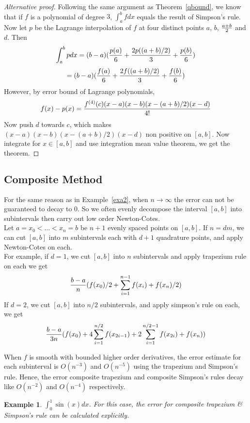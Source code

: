 \documentclass[20pt]{article} %
\theoremstyle{break}
\newtheorem{exa}[definition]{Example}
\begin{document}
\begin{proof}[Alternative proof]
  Following the same argument as Theorem~\ref{qbound}, we know that if $f$ is a polynomial of degree $3$, $\int_a^bfdx$ equals the result of Simpson's rule.\\

  Now let $p$ be the Lagrange interpolation of $f$ at four distinct points $a$, $b$, $a+b\over 2$ and $d$. Then
  \[\int_a^bpdx=(b-a)({p(a)\over 6}+{2p((a+b)/2)\over 3}+{p(b)\over 6})\]
  \[=(b-a)({f(a)\over 6}+{2f((a+b)/2)\over 3}+{f(b)\over 6})\]
  However, by error bound of Lagrange polynomials, 
  \[f(x)-p(x)={f^{(4)}(c)(x-a)(x-b)(x-(a+b)/2)(x-d)\over 4!}\]
  Now push $d$ towards $c$, which makes $(x-a)(x-b)(x-(a+b)/2)(x-d)$ non positive on $[a, b]$. Now integrate for $x\in [a, b]$ and use integration mean value theorem, we get the theorem.
\end{proof}

\newpage

\subsection{Composite Method}

For the same reason as in Example~\ref{exa2}, when $n\rightarrow\infty$ the error can not be guaranteed to decay to $0$. So we often evenly decompose the interval $[a, b]$ into subintervals then carry out low order Newton-Cotes.\\

Let $a=x_0<\dots<x_n=b$ be $n+1$ evenly spaced points on $[a, b]$. If $n=dm$, we can cut $[a, b]$ into $m$ subintervals each with $d+1$ quadrature points, and apply Newton-Cotes on each.\\

For example, if $d=1$, we cut $[a, b]$ into $n$ subintervals and apply trapezium rule on each we get
\[{b-a\over n}(f(x_0)/2+\sum_{i=1}^{n-1}f(x_i)+f(x_n)/2)\]
If $d=2$, we cut $[a, b]$ into $n/2$ subintervals, and apply simpson's rule on each, we get
\[{b-a\over 3n}(f(x_0)+4\sum_{i=1}^{n/2}f(x_{2i-1})+2\sum_{i=1}^{n/2-1}f(x_{2i})+f(x_n))\]

\newpage


When $f$ is smooth with bounded higher order derivatives, the error estimate for each subinterval is $O(n^{-3})$ and $O(n^{-5})$ using the trapezium and Simpson's rule. Hence, the error composite trapezium and composite Simpson's rules decay like $O(n^{-2})$ and $O(n^{-4})$ respectively.


\begin{exa} $\int_0^1\sin(x)dx$. For this case, the error for composite trapezium \& Simpson's rule can be calculated explicitly. \end{exa}
\end{document}
